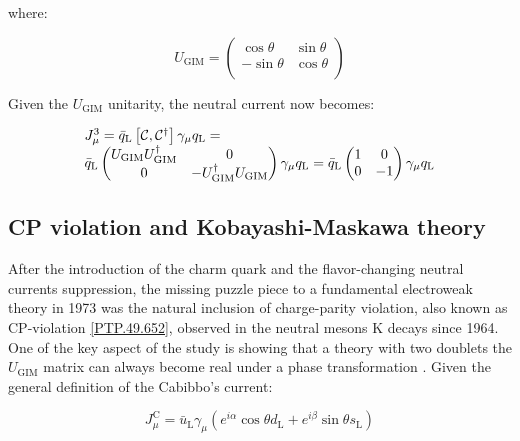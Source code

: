 where:

\begin{equation}
U_{\text{GIM}} =
\begin{pmatrix}
\cos\theta &\sin\theta \\
-\sin\theta &\cos\theta \\
\end{pmatrix}
\end{equation}

Given the $U_{\text{GIM}}$ unitarity, the neutral current now becomes:

\begin{equation}
	\begin{array}{l c l}
		J^{3}_{\mu} = \bar{q}_{\text{L}}\left[\mathcal{C}, \mathcal{C}^{\dagger} \right]\gamma_{\mu}q_{\text{L}} = \\
		\bar{q}_{\text{L}}
		\begin{pmatrix}
			U_{\text{GIM}}U_{\text{GIM}}^{\dagger} &0 \\
			0 &-U_{\text{GIM}}^{\dagger}U_{\text{GIM}} \\
		\end{pmatrix}
		\gamma_{\mu}q_{\text{L}} = \bar{q}_{\text{L}}
		\begin{pmatrix}
			1 &0 \\
			0 &-1 \\
		\end{pmatrix}
		\gamma_{\mu}q_{\text{L}}
	\end{array}
\end{equation}

\subsection{CP violation and Kobayashi-Maskawa theory}

After the introduction of the charm quark and the flavor-changing neutral currents suppression, the missing puzzle piece to a fundamental electroweak theory in 1973 was the natural inclusion of charge-parity violation, also known as CP-violation \ref{PTP.49.652}, observed in the neutral mesons K decays since 1964. 
One of the key aspect of the study is showing that a theory with two doublets the $U_{\text{GIM}}$ matrix can always become real under a phase transformation \cite{Glashow:1970gm}. Given the general definition of the Cabibbo's current:

\begin{equation}
J^{\text{C}}_{\mu} = \bar{u}_{\text{L}}\gamma_{\mu}\left( e^{i\alpha} \cos\theta d_{\text{L}} + e^{i\beta}\sin\theta s_{\text{L}}   \right)
\end{equation}

